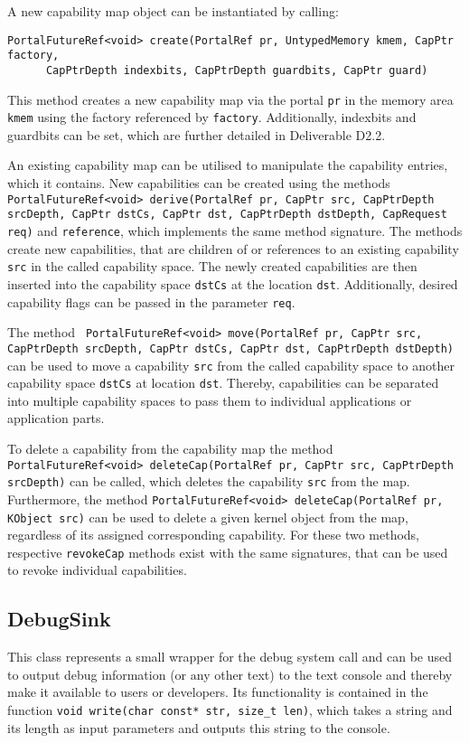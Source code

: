 A new capability map object can be instantiated by calling:
\lstset{language=c++}
\begin{lstlisting}
PortalFutureRef<void> create(PortalRef pr, UntypedMemory kmem, CapPtr factory,
      CapPtrDepth indexbits, CapPtrDepth guardbits, CapPtr guard)
\end{lstlisting}

This method creates a new capability map via the portal \texttt{pr} in the memory
area \texttt{kmem} using the factory referenced by \texttt{factory}.
Additionally, indexbits and guardbits can be set, which are further detailed in
Deliverable D2.2.

An existing capability map can be utilised to manipulate the capability entries, which it contains. New capabilities can be created using the methods \texttt{PortalFutureRef<void> derive(PortalRef pr, CapPtr src, CapPtrDepth srcDepth, CapPtr dstCs, CapPtr dst, CapPtrDepth dstDepth, CapRequest req)} and \texttt{reference}, which implements the same method signature.  The methods create new capabilities, that are children of or references to an existing capability \texttt{src} in the called capability space. The newly created capabilities are then inserted into the capability space \texttt{dstCs} at the location \texttt{dst}. Additionally, desired capability flags can be passed in the parameter \texttt{req}. 

The method \texttt{ PortalFutureRef<void> move(PortalRef pr, CapPtr src, \\CapPtrDepth srcDepth, CapPtr dstCs, CapPtr dst, CapPtrDepth dstDepth)} can be used to move a capability \texttt{src} from the called capability space to another capability space \texttt{dstCs} at location \texttt{dst}. Thereby, capabilities can be separated into multiple capability spaces to pass them to individual applications or application parts.

To delete a capability from the capability map the method \texttt{PortalFutureRef<void> deleteCap(PortalRef pr, CapPtr src, CapPtrDepth srcDepth)} can be called, which deletes the capability \texttt{src} from the map. Furthermore, the method \texttt{PortalFutureRef<void> deleteCap(PortalRef pr, KObject src)} can be used to delete a given kernel object from the map, regardless of its assigned corresponding capability. For these two methods, respective \texttt{revokeCap} methods exist with the same signatures, that can be used to revoke individual capabilities.

\subsection{DebugSink}
This class represents a small wrapper for the debug system call and can be used
to output debug information (or any other text) to the text console and thereby
make it available to users or developers. Its functionality is contained in the
function \texttt{void write(char const* str, size\_t len)}, which takes a string
and its length as input parameters and outputs this string to the console.

